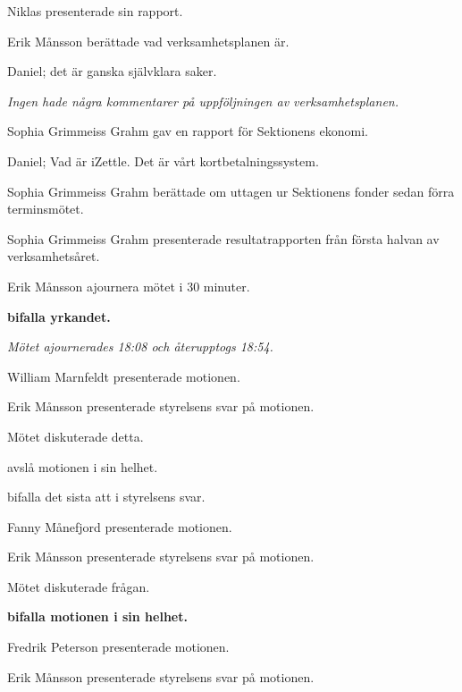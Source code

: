 \documentclass[10pt]{article}
\begin{document}
\begin{paragrafer}
Niklas presenterade sin rapport.

Erik Månsson berättade vad verksamhetsplanen är.

Daniel; det är ganska självklara saker.

\emph{Ingen hade några kommentarer på uppföljningen av verksamhetsplanen.}

Sophia Grimmeiss Grahm gav en rapport för Sektionens ekonomi.

Daniel; Vad är iZettle. Det är vårt kortbetalningssystem.

Sophia Grimmeiss Grahm berättade om uttagen ur Sektionens fonder sedan förra terminsmötet.

Sophia Grimmeiss Grahm presenterade resultatrapporten från första halvan av verksamhetsåret.

Erik Månsson \ypa ajournera mötet i 30 minuter.

\textbf{\Mba bifalla yrkandet.}

\emph{Mötet ajournerades 18:08 och återupptogs 18:54.}

    \begin{paragrafer}
        William Marnfeldt presenterade motionen.

        Erik Månsson presenterade styrelsens svar på motionen.

        Mötet diskuterade detta.

        \Mba avslå motionen i sin helhet.

        \Mba bifalla det sista att i styrelsens svar.

        Fanny Månefjord presenterade motionen.

        Erik Månsson presenterade styrelsens svar på motionen.

        Mötet diskuterade frågan.

        \textbf{\Mba bifalla motionen i sin helhet.}

        Fredrik Peterson presenterade motionen.

        Erik Månsson presenterade styrelsens svar på motionen.


\end{paragrafer}
\end{paragrafer}
\end{document}
